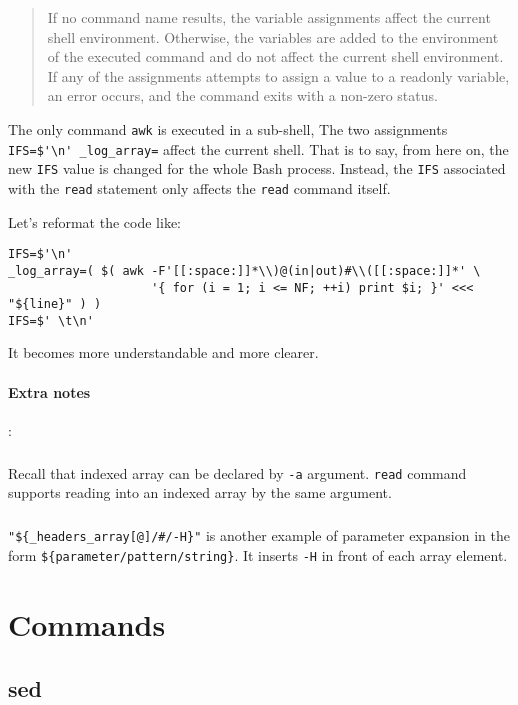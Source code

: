 \begin{quotation}
  If no command name results, the variable assignments affect the
  current shell environment. Otherwise, the variables are added to
  the environment of the executed command and do not affect the
  current shell environment. If any of the assignments attempts to
  assign a value to a readonly variable, an error occurs, and the
  command exits with a non-zero status.
\end{quotation}

The only command \lstinline|awk| is executed in a sub-shell, The
two assignments
\lstinline|IFS=$'\n' _log_array=| affect the current shell. That
is to say, from here on, the new \lstinline|IFS| value is changed
for the whole Bash process. Instead, the \lstinline|IFS|
associated with the \lstinline|read| statement only affects the
\lstinline|read| command itself.

Let's reformat the code like:

\begin{lstlisting}[basicstyle=\tiny\ttfamily]
IFS=$'\n'
_log_array=( $( awk -F'[[:space:]]*\\)@(in|out)#\\([[:space:]]*' \
                    '{ for (i = 1; i <= NF; ++i) print $i; }' <<< "${line}" ) )
IFS=$' \t\n'
\end{lstlisting}

It becomes more understandable and more clearer.

\paragraph{Extra notes}: \subparagraph{} Recall that indexed array
can be declared by \lstinline|-a| argument. \lstinline|read|
command supports reading into an indexed array by the same
argument.  \subparagraph{}
\lstinline|"${_headers_array[@]/#/-H}"| is another example of
parameter expansion in the form
\lstinline|${parameter/pattern/string}|. It inserts \lstinline|-H|
in front of each array element.

\section{Commands}
\label{sec:bash-commands}

\subsection{sed}
\label{sec:bash-sed}

